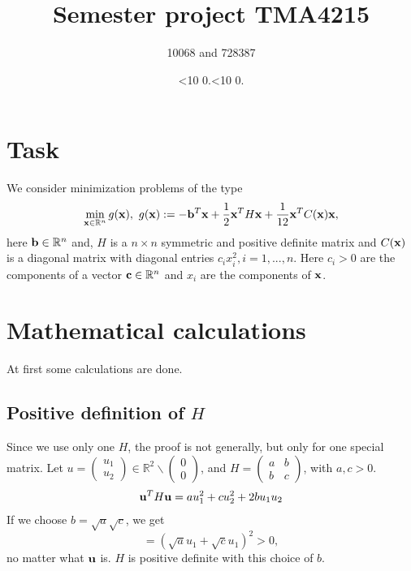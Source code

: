 \documentclass[a4paper,12pt]{article}
\newcommand{\leadingzero}[1]{\ifnum #1<10 0\the#1\else\the#1\fi}
\newcommand{\mytoday}{\leadingzero{\day}.\leadingzero{\month}.\the\year}
\begin{document}
\title{Semester project TMA4215}
\author{10068 and 728387}
\date{\mytoday}
\maketitle


\section{Task}
We consider minimization problems of the type
\begin{align*}
\min_{{\bf x} \in \mathbb{R}^n} g({\bf x}),\,\, g({\bf x}):=-{\bf b}^T{\bf x} + \frac12{\bf x}^TH{\bf x}+\frac1{12}{\bf x}^TC({\bf x}){\bf x},
\end{align*}
here ${\bf b} \in \mathbb{R}^n$ and, $H$ is a $n \times n$ symmetric and positive definite matrix and $C(\bf{x})$ is a diagonal
matrix with diagonal entries $c_i x^2_i, i = 1, . . . , n$. 
Here $c_i > 0$ are the components of a vector ${\bf c} \in \mathbb{R}^n$ 
and $x_i$ are the components of $\bf{x}$. 

\section{Mathematical calculations}
At first some calculations are done.
\subsection{Positive definition of $H$}\label{definit}
Since we use only one $H$, the proof is not generally, but only for one special matrix.
Let $u=\begin{pmatrix}u_1\\u_2\end{pmatrix}\in \mathbb{R}^2\backslash \begin{pmatrix}0\\0\end{pmatrix}$, and $H= \begin{pmatrix} a&b\\b&c\end{pmatrix}$, with $a,c>0$.
\begin{align*}
{\bf u}^TH{\bf u} = au_1^2 + cu_2^2 + 2 b u_1u_2
\end{align*}
If we choose $b = \sqrt{a}\sqrt{c}$, we get
$$ = (\sqrt{a}u_1+\sqrt{c}u_1)^2 >0,$$
no matter what ${\bf u}$ is. 
$H$ is positive definite with this choice of $b$.
\end{document}
